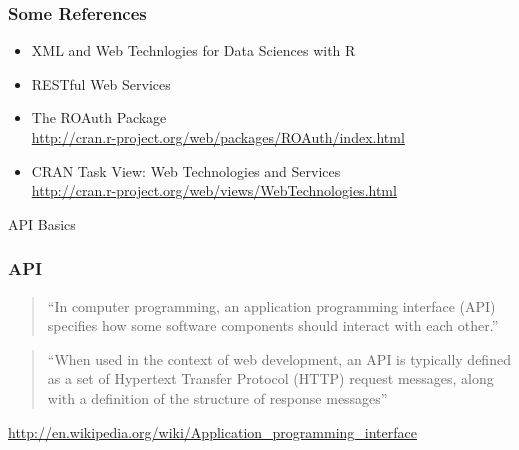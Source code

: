 \documentclass{beamer}\usepackage[]{graphicx}\usepackage[]{color}
\begin{document}
\begin{frame}
\frametitle{Some References}

\begin{itemize}
 \item XML and Web Technlogies for Data Sciences with R \\
 \item RESTful Web Services \\
 \item The ROAuth Package \\
 {\scriptsize \url{http://cran.r-project.org/web/packages/ROAuth/index.html}}
 \item CRAN Task View: Web Technologies and Services \\
 {\scriptsize \url{http://cran.r-project.org/web/views/WebTechnologies.html}}
\end{itemize}

\end{frame}


\begin{frame}
 \begin{center}
  \Huge{\textcolor{mandarina}{API Basics}}
 \end{center}
\end{frame}


\begin{frame}
\frametitle{API}

\begin{quotation}
``In computer programming, an application programming interface (API) specifies how some software components should interact with each other.''
\end{quotation}

\begin{quotation}
``When used in the context of web development, an API is typically defined as a set of Hypertext Transfer Protocol (HTTP) request messages, along with a definition of the structure of response messages''
\end{quotation}

{\scriptsize 
\hspace{8mm} \url{http://en.wikipedia.org/wiki/Application\_programming\_interface}
}

\end{frame}
\end{document}
